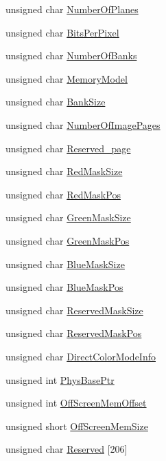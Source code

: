 \begin{DoxyCompactItemize}
\item 
unsigned char \hyperlink{struct_m_o_d_e___i_n_f_o_af2cab2389902deca91d2410ee8fbd067}{Number\+Of\+Planes}
\item 
unsigned char \hyperlink{struct_m_o_d_e___i_n_f_o_a880652ae9c52f6a83e1fbf38f2799de9}{Bits\+Per\+Pixel}
\item 
unsigned char \hyperlink{struct_m_o_d_e___i_n_f_o_af47ccee3ea2d7b618128f3ea97880f86}{Number\+Of\+Banks}
\item 
unsigned char \hyperlink{struct_m_o_d_e___i_n_f_o_a8a72ec6a9d9dcf889d05447372f6b8ed}{Memory\+Model}
\item 
unsigned char \hyperlink{struct_m_o_d_e___i_n_f_o_a14d876ec0e1f5bcaa21e69086c200b50}{Bank\+Size}
\item 
unsigned char \hyperlink{struct_m_o_d_e___i_n_f_o_a5c82ed2c8587e816e139e64fc82e3a97}{Number\+Of\+Image\+Pages}
\item 
unsigned char \hyperlink{struct_m_o_d_e___i_n_f_o_ae271e35fb165aea98b15a79ea692c237}{Reserved\+\_\+page}
\item 
unsigned char \hyperlink{struct_m_o_d_e___i_n_f_o_a913ed780543a2466489f9d2b54761c5d}{Red\+Mask\+Size}
\item 
unsigned char \hyperlink{struct_m_o_d_e___i_n_f_o_a69b9f065c3877b921e1e28ae74d51029}{Red\+Mask\+Pos}
\item 
unsigned char \hyperlink{struct_m_o_d_e___i_n_f_o_a4727bb6ac8a21b55a26cd70afdf07b93}{Green\+Mask\+Size}
\item 
unsigned char \hyperlink{struct_m_o_d_e___i_n_f_o_a812caaff15468cef3ea4207ceb2c16c4}{Green\+Mask\+Pos}
\item 
unsigned char \hyperlink{struct_m_o_d_e___i_n_f_o_a3f3aae9079285d788424ddf9c0ab4da9}{Blue\+Mask\+Size}
\item 
unsigned char \hyperlink{struct_m_o_d_e___i_n_f_o_ae2adf5427d1c133490ef54268d409bde}{Blue\+Mask\+Pos}
\item 
unsigned char \hyperlink{struct_m_o_d_e___i_n_f_o_a476c52eecf02936bc170809f375bde05}{Reserved\+Mask\+Size}
\item 
unsigned char \hyperlink{struct_m_o_d_e___i_n_f_o_adaa96a124ba7fecf2c5930779e289183}{Reserved\+Mask\+Pos}
\item 
unsigned char \hyperlink{struct_m_o_d_e___i_n_f_o_a2ed2e0b7027fd0394545e4967e59d9bf}{Direct\+Color\+Mode\+Info}
\item 
unsigned int \hyperlink{struct_m_o_d_e___i_n_f_o_ab2680bfa18eb9cf5112bba5fb0c6622a}{Phys\+Base\+Ptr}
\item 
unsigned int \hyperlink{struct_m_o_d_e___i_n_f_o_a2f550578827e82fdea72691553d9dceb}{Off\+Screen\+Mem\+Offset}
\item 
unsigned short \hyperlink{struct_m_o_d_e___i_n_f_o_a0e9c84a1dda1268b6225df5b7d832f0c}{Off\+Screen\+Mem\+Size}
\item 
unsigned char \hyperlink{struct_m_o_d_e___i_n_f_o_afed368ddd295ce1d5f6ee6c7f0e745a5}{Reserved} \mbox{[}206\mbox{]}
\end{DoxyCompactItemize}


